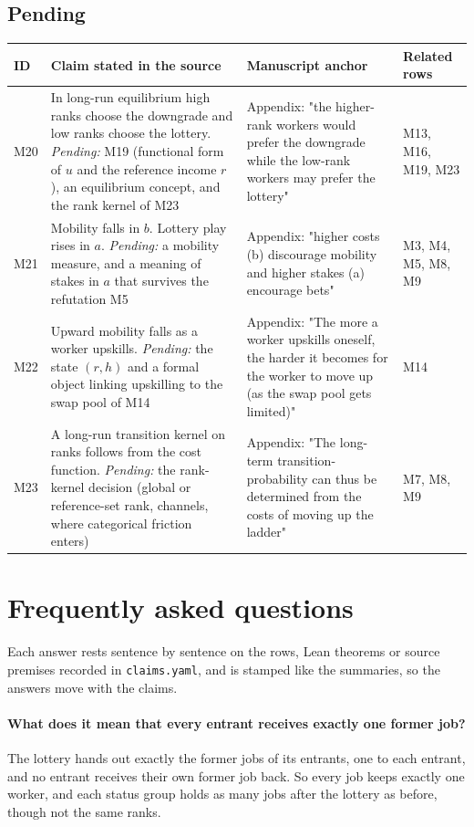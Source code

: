 \documentclass[10pt]{article}
\newcommand{\pend}[1]{\textit{Pending:} #1}
\begin{document}
\subsection*{Pending}
{\small
\begin{longtable}{>{\raggedright\arraybackslash}p{0.8cm} >{\raggedright\arraybackslash}p{10.6cm} >{\raggedright\arraybackslash}p{7.4cm} >{\raggedright\arraybackslash}p{4.2cm}}
\toprule ID & Claim stated in the source & Manuscript anchor & Related rows \\ \midrule \endhead
M20 & In long-run equilibrium high ranks choose the downgrade and low ranks choose the lottery. \pend{M19 (functional form of $u$ and the reference income $r$), an equilibrium concept, and the rank kernel of M23} & Appendix: "the higher-rank workers would prefer the downgrade while the low-rank workers may prefer the lottery" & M13, M16, M19, M23 \\ \midrule
M21 & Mobility falls in $b$. Lottery play rises in $a$. \pend{a mobility measure, and a meaning of stakes in $a$ that survives the refutation M5} & Appendix: "higher costs (b) discourage mobility and higher stakes (a) encourage bets" & M3, M4, M5, M8, M9 \\ \midrule
M22 & Upward mobility falls as a worker upskills. \pend{the state $(r,h)$ and a formal object linking upskilling to the swap pool of M14} & Appendix: "The more a worker upskills oneself, the harder it becomes for the worker to move up (as the swap pool gets limited)" & M14 \\ \midrule
M23 & A long-run transition kernel on ranks follows from the cost function. \pend{the rank-kernel decision (global or reference-set rank, channels, where categorical friction enters)} & Appendix: "The long-term transition-probability can thus be determined from the costs of moving up the ladder" & M7, M8, M9 \\ \midrule
\end{longtable}}

\section{Frequently asked questions}
Each answer rests sentence by sentence on the rows, Lean theorems or source premises recorded in \texttt{claims.yaml}, and is stamped like the summaries, so the answers move with the claims.

\paragraph{What does it mean that every entrant receives exactly one former job?} The lottery hands out exactly the former jobs of its entrants, one to each entrant, and no entrant receives their own former job back. So every job keeps exactly one worker, and each status group holds as many jobs after the lottery as before, though not the same ranks.
\end{document}

